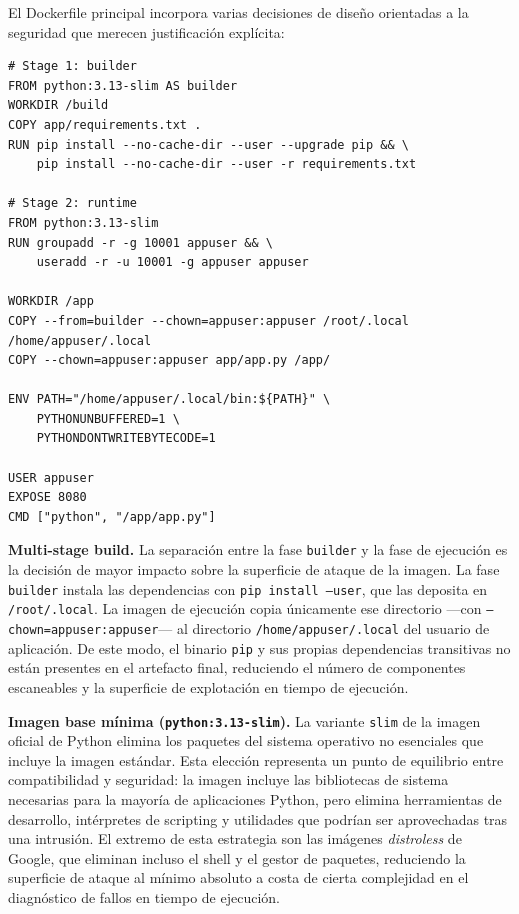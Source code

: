 El Dockerfile principal incorpora varias decisiones de diseño orientadas a la seguridad que merecen justificación explícita:

\begin{lstlisting}
# Stage 1: builder
FROM python:3.13-slim AS builder
WORKDIR /build
COPY app/requirements.txt .
RUN pip install --no-cache-dir --user --upgrade pip && \
    pip install --no-cache-dir --user -r requirements.txt

# Stage 2: runtime
FROM python:3.13-slim
RUN groupadd -r -g 10001 appuser && \
    useradd -r -u 10001 -g appuser appuser

WORKDIR /app
COPY --from=builder --chown=appuser:appuser /root/.local /home/appuser/.local
COPY --chown=appuser:appuser app/app.py /app/

ENV PATH="/home/appuser/.local/bin:${PATH}" \
    PYTHONUNBUFFERED=1 \
    PYTHONDONTWRITEBYTECODE=1

USER appuser
EXPOSE 8080
CMD ["python", "/app/app.py"]
\end{lstlisting}

\textbf{Multi-stage build.} La separación entre la fase \texttt{builder} y la fase de ejecución es la decisión de mayor impacto sobre la superficie de ataque de la imagen. La fase \texttt{builder} instala las dependencias con \texttt{pip install --user}, que las deposita en \texttt{/root/.local}. La imagen de ejecución copia únicamente ese directorio ---con \texttt{--chown=appuser:appuser}--- al directorio \texttt{/home/appuser/.local} del usuario de aplicación. De este modo, el binario \texttt{pip} y sus propias dependencias transitivas no están presentes en el artefacto final, reduciendo el número de componentes escaneables y la superficie de explotación en tiempo de ejecución.

\textbf{Imagen base mínima (\texttt{python:3.13-slim}).} La variante \texttt{slim} de la imagen oficial de Python elimina los paquetes del sistema operativo no esenciales que incluye la imagen estándar. Esta elección representa un punto de equilibrio entre compatibilidad y seguridad: la imagen incluye las bibliotecas de sistema necesarias para la mayoría de aplicaciones Python, pero elimina herramientas de desarrollo, intérpretes de scripting y utilidades que podrían ser aprovechadas tras una intrusión. El extremo de esta estrategia son las imágenes \textit{distroless} \cite{distroless_docs} de Google, que eliminan incluso el shell y el gestor de paquetes, reduciendo la superficie de ataque al mínimo absoluto a costa de cierta complejidad en el diagnóstico de fallos en tiempo de ejecución.

